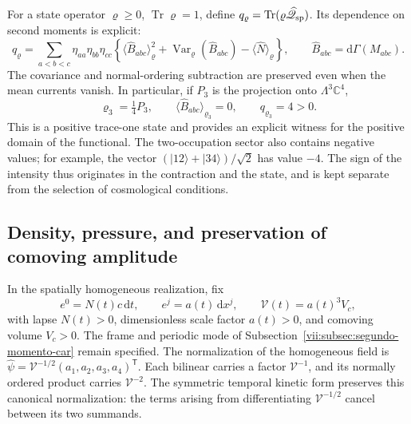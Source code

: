 For a state operator \(\varrho\geq0\),
\(\operatorname{Tr}\varrho=1\), define
\(q_\varrho=\operatorname{Tr}(\varrho\widehat{\mathscr Q}_{\rm sp})\).
Its dependence on second moments is explicit:
\begin{equation}
 q_\varrho=\sum_{a<b<c}\eta_{aa}\eta_{bb}\eta_{cc}
 \left\{
  \langle\widehat B_{abc}\rangle_\varrho^2
  +\operatorname{Var}_\varrho(\widehat B_{abc})
  -\langle\widehat N\rangle_\varrho
 \right\},\qquad
 \widehat B_{abc}=\mathrm d\Gamma(M_{abc}).
 \label{vii:eq:covarianza-espin-material}
\end{equation}
The covariance and normal-ordering subtraction are preserved even when
the mean currents vanish. In particular, if \(P_3\) is the
projection onto \(\Lambda^3\mathbb C^4\),
\begin{equation}
 \varrho_3=\tfrac14P_3,\qquad
 \langle\widehat B_{abc}\rangle_{\varrho_3}=0,\qquad
 q_{\varrho_3}=4>0.
 \label{vii:eq:testigo-positivo-espin}
\end{equation}
This is a positive trace-one state and provides an explicit witness
for the positive domain of the functional. The two-occupation sector
also contains negative values; for example, the vector
\((|12\rangle+|34\rangle)/\sqrt2\) has value \(-4\).
The sign of the intensity thus originates in the contraction and
the state, and is kept separate from the selection of cosmological conditions.

\subsection{Density, pressure, and preservation of comoving amplitude}
\label{vii:subsec:amplitud-espinorial-comovil}

In the spatially homogeneous realization, fix
\[
 e^0=N(t)c\,\mathrm dt,\qquad e^j=a(t)\,\mathrm dx^j,
 \qquad \mathcal V(t)=a(t)^3V_c,
\]
with lapse \(N(t)>0\), dimensionless scale factor \(a(t)>0\),
and comoving volume \(V_c>0\). The frame and periodic mode of
Subsection~\ref{vii:subsec:segundo-momento-car} remain specified.
The normalization of the homogeneous field is
\(\widehat\psi=\mathcal V^{-1/2}(a_1,a_2,a_3,a_4)^{\mathsf T}\).
Each bilinear carries a factor \(\mathcal V^{-1}\), and its normally
ordered product carries \(\mathcal V^{-2}\). The symmetric temporal
kinetic form preserves this canonical normalization: the terms arising
from differentiating \(\mathcal V^{-1/2}\) cancel between
its two summands.

